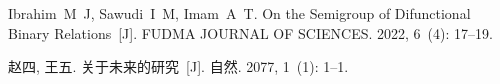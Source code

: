 \pagestyle{fancy}
\fancyhead{} %

\fancyhead[CO]{\leftmark} %



\begin{thebibliography}{99}


Ibrahim~M~J, Sawudi~I~M, Imam~A~T.
On the Semigroup of Difunctional Binary Relations~[J].
FUDMA JOURNAL OF SCIENCES.
2022, 6~(4):  17--19.

赵四, 王五.
关于未来的研究~[J].
自然.
2077, 1~(1):  1--1.

\end{thebibliography}

